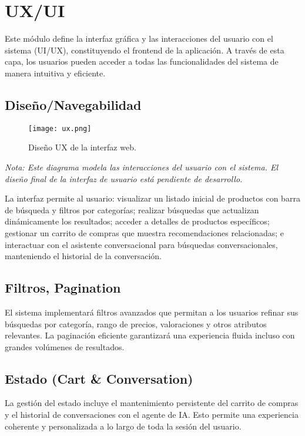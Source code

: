 \section{UX/UI}

Este módulo define la interfaz gráfica y las interacciones del usuario con el sistema (UI/UX), constituyendo el frontend de la aplicación. A través de esta capa, los usuarios pueden acceder a todas las funcionalidades del sistema de manera intuitiva y eficiente.

\subsection{Diseño/Navegabilidad}

\begin{figure}[H]
    \centering
    \texttt{[image: ux.png]}
    \caption{Diseño UX de la interfaz web.}
    \label{fig:ux_design}
\end{figure}

\noindent \textit{Nota: Este diagrama modela las interacciones del usuario con el sistema. El diseño final de la interfaz de usuario está pendiente de desarrollo.}

\vspace{0.75cm}

La interfaz permite al usuario: visualizar un listado inicial de productos con barra de búsqueda y filtros por categorías; realizar búsquedas que actualizan dinámicamente los resultados; acceder a detalles de productos específicos; gestionar un carrito de compras que muestra recomendaciones relacionadas; e interactuar con el asistente conversacional para búsquedas conversacionales, manteniendo el historial de la conversación.

\subsection{Filtros, Pagination}

El sistema implementará filtros avanzados que permitan a los usuarios refinar sus búsquedas por categoría, rango de precios, valoraciones y otros atributos relevantes. La paginación eficiente garantizará una experiencia fluida incluso con grandes volúmenes de resultados.

\subsection{Estado (Cart \& Conversation)}

La gestión del estado incluye el mantenimiento persistente del carrito de compras y el historial de conversaciones con el agente de IA. Esto permite una experiencia coherente y personalizada a lo largo de toda la sesión del usuario.
